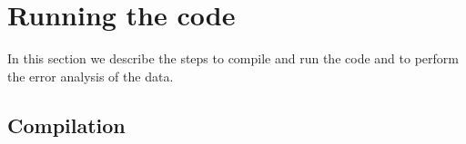 
\section{Running the code}\label{sec:running}

In this section we describe the steps to compile and run the code and to perform the error analysis of the data.

\subsection{Compilation}

